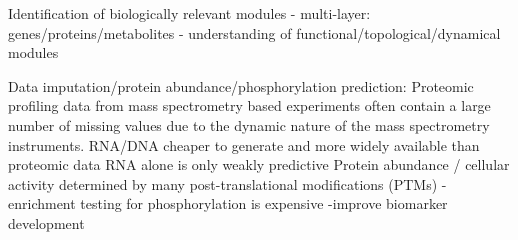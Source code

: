 \documentclass{report}
\begin{document}
	Identification of biologically relevant modules
	- multi-layer: genes/proteins/metabolites
	- understanding of functional/topological/dynamical modules
	
	Data imputation/protein abundance/phosphorylation prediction: 
	Proteomic profiling data from mass spectrometry based experiments often contain a large number of missing values due to the dynamic nature of the mass spectrometry instruments.
	RNA/DNA cheaper to generate and more widely available than proteomic data
	RNA alone is only weakly predictive \cite{vogel2012insights}
	Protein abundance / cellular activity determined by many post-translational modifications (PTMs)
	-enrichment testing for phosphorylation is expensive
	-improve biomarker development
	
	
	
	
	
	
	
\end{document}
